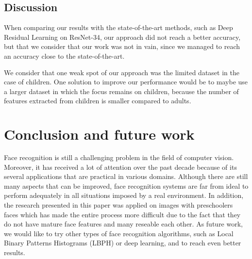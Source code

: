 \documentclass[runningheads,a4paper,11pt]{report}
\begin{document}
    \section{Discussion}
    \label{section:discussion}

    When comparing our results with the state-of-the-art methods, such as Deep Residual Learning on ResNet-34, our approach did not reach a better accuracy, but that we consider that our work was not in vain, since we managed to reach an accuracy close to the state-of-the-art.

    We consider that one weak spot of our approach was the limited dataset in the case of children. One solution to improve our performance would be to maybe use a larger dataset in which the focus remains on children, because the number of features extracted from children is smaller compared to adults.

    \chapter{Conclusion and future work}
    \label{chapter:concl}
    Face recognition is still a challenging problem in the field of computer vision. Moreover, it has received a lot of attention over the past decade because of its several applications that are practical in various domains. Although there are still many aspects that can be improved, face recognition systems are far from ideal to perform adequately in all situations imposed by a real environment.
    In addition, the research presented in this paper was applied on images with preschoolers faces which has made the entire process more difficult due to the fact that they do not have mature face features and many reseable each other.
    As future work, we would like to try other types of face recognition algorithms, such as Local Binary Patterns Histograms (LBPH) or deep learning, and to reach even better results.



    
    
\end{document}
